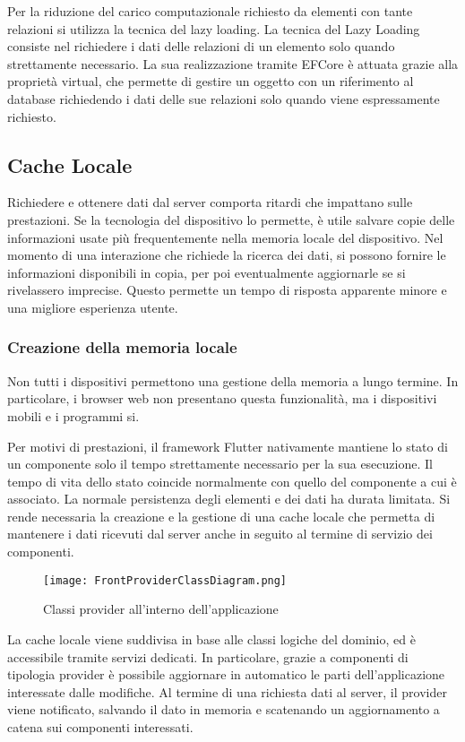 Per la riduzione del carico computazionale richiesto da elementi con tante relazioni si utilizza la tecnica del lazy loading. La tecnica del Lazy Loading consiste nel richiedere i dati delle relazioni di un elemento solo quando strettamente necessario. La sua realizzazione tramite EFCore è attuata grazie alla proprietà virtual, che permette di gestire un oggetto con un riferimento al database richiedendo i dati delle sue relazioni solo quando viene espressamente richiesto.


\clearpage
\subsection{ Cache Locale}

Richiedere e ottenere dati dal server comporta ritardi che impattano sulle prestazioni. 
Se la tecnologia del dispositivo lo permette, è utile salvare copie delle informazioni usate più frequentemente nella memoria locale del dispositivo. Nel momento di una interazione che richiede la ricerca dei dati, si possono fornire le informazioni disponibili in copia, per poi eventualmente aggiornarle se si rivelassero imprecise. Questo permette un tempo di risposta apparente minore e una migliore esperienza utente.
\subsubsection{ Creazione della memoria locale}
Non tutti i dispositivi permettono una gestione della memoria a lungo termine. In particolare, i browser web non presentano questa funzionalità, ma i dispositivi mobili e i programmi si. 

Per motivi di prestazioni, il framework Flutter nativamente mantiene lo stato di un componente solo il tempo strettamente necessario per la sua esecuzione. Il tempo di vita dello stato coincide normalmente con quello del componente a cui è associato. La normale persistenza degli elementi e dei dati ha durata limitata. Si rende necessaria la creazione e la gestione di una cache locale che permetta di mantenere i dati ricevuti dal server anche in seguito al termine di servizio dei componenti.

\begin{figure}[h!]
    \centering
    \texttt{[image: FrontProviderClassDiagram.png]}
    \caption{Classi provider all'interno dell'applicazione}
\end{figure}	
La cache locale viene suddivisa in base alle classi logiche del dominio, ed è accessibile tramite servizi dedicati. In particolare, grazie a componenti di tipologia provider è possibile aggiornare in automatico le parti dell’applicazione interessate dalle modifiche. Al termine di una richiesta dati al server, il provider viene notificato, salvando il dato in memoria e scatenando un aggiornamento a catena sui componenti interessati.

